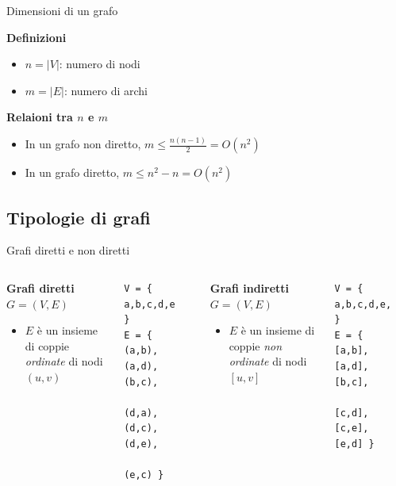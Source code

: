 \documentclass[compress]{beamer}
\begin{document}
\begin{frame}{Dimensioni di un grafo}
  \begin{block}{\textbf{Definizioni}}
    \begin{itemize}
      \item $n = |V|$: numero di nodi
      \item $m = |E|$: numero di archi
    \end{itemize}
  \end{block}
  \pause
    \begin{block}{\textbf{Relaioni tra $n$ e $m$}}
        \begin{itemize}
          \item In un grafo non diretto, $m \leq \frac{n(n-1)}{2} = O(n^2)$
          \item In un grafo diretto, $m \leq n^2 - n = O(n^2)$
        \end{itemize}
    \end{block}
\end{frame}

\subsection{Tipologie di grafi}
\begin{frame}[fragile]{Grafi diretti e non diretti}
  \begin{columns}
  \begin{block}{\textbf{Grafi diretti} $G = (V, E)$}
    \begin{itemize}
      \item $E$ \`e un insieme di coppie \emph{ordinate} di nodi $(u, v)$
    \end{itemize}
  \end{block}
  \begin{verbatim}
V = { a,b,c,d,e,f }
E = { (a,b),(a,d),(b,c),
      (d,a),(d,c),(d,e),
      (e,c) }
  \end{verbatim}
  \begin{center}
  \scalebox{0.65}{}
  \end{center}
  \begin{block}{\textbf{Grafi indiretti} $G = (V, E)$}
    \begin{itemize}
      \item $E$ \`e un insieme di coppie \emph{non ordinate} di nodi $[u, v]$
    \end{itemize}
  \end{block}
  \begin{verbatim}
V = { a,b,c,d,e,f }
E = { [a,b],[a,d],[b,c],
      [c,d],[c,e],[e,d] }

  \end{verbatim}
  \begin{center}
  \scalebox{0.65}{}
  \end{center}
\end{columns}
\end{frame}
\end{document}
